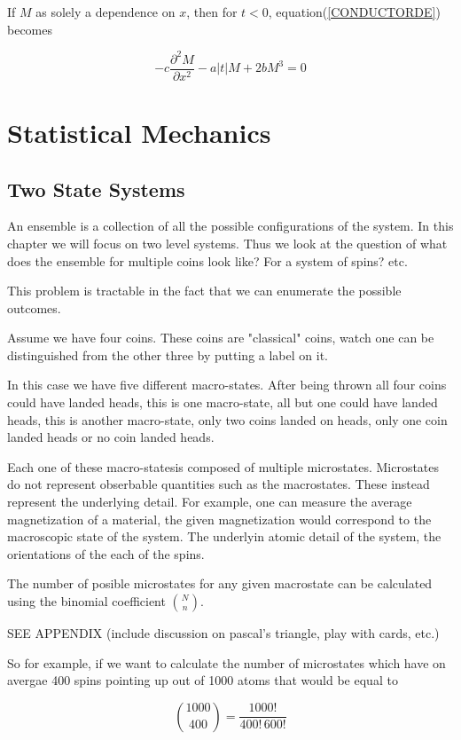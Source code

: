 \documentclass[10pt,twoside,openright]{memoir}
\begin{document}
If $M$ as solely a dependence on $x$, then for $t<0$, equation(\ref{CONDUCTORDE}) becomes

$$
- c \frac{\partial ^2 M}{\partial x^2} - a |t| M + 2bM^3 = 0
$$

\chapter{Statistical Mechanics}

\section{\label{sec:level2} Two State Systems}

An ensemble is a collection of all the possible configurations of the system.
In this chapter we will focus on two level systems. Thus we look at the question of what does the ensemble for multiple coins look like? For a system of spins? etc.

This problem is tractable in the fact that we can enumerate the possible outcomes.

Assume we have four coins. These coins are "classical" coins, watch one can be distinguished from the other three by putting a label on it.

In this case we have five different macro-states. After being thrown all four coins could have landed heads, this is one macro-state, all but one could have landed heads, this is another macro-state, only two coins landed on heads, only one coin landed heads or no coin landed heads.

Each one of these macro-statesis composed of multiple microstates. Microstates do not represent obserbable quantities such as the macrostates. These instead represent the underlying detail. For example, one can measure the average magnetization of a material, the given magnetization would correspond to the macroscopic state of the system. The underlyin atomic detail of the system, the orientations of the each of the spins.

The number of posible microstates for any given macrostate can be calculated using the binomial coefficient ${N \choose n }$.

SEE APPENDIX (include discussion on pascal's triangle, play with cards, etc.)

So for example, if we want to calculate the number of microstates which have on avergae 400 spins pointing up out of 1000 atoms that would be equal to

$$ {1000 \choose 400} = \frac{1000!}{400! \, 600!} $$
\end{document}

